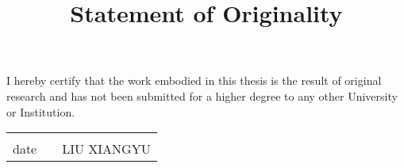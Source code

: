 \documentclass[a4paper,12pt]{article}
\title{\textbf{Statement of Originality}}
\date{\vspace{-15ex}}
\begin{document}
\maketitle
I hereby certify that the work embodied in this thesis is the result of original research and has not been submitted for a higher degree to any other University or Institution.\\[0.8in]

\begin{center}
\begin{tabular}{p{3cm}<{\centering}p{3cm}p{4cm}<{\centering}}
\dashuline{\ \ \ \ \ \ \ \ \ \ \ \ \ \ \ \ \ \ \ }& &\dashuline{\ \ \ \ \ \ \ \ \ \ \ \ \ \ \ \ \ \ \ \ \ \ \ \ \ \ \ \ \ \ }\\
date&&LIU XIANGYU
\end{tabular}
\end{center}
\thispagestyle{empty}
\end{document}
